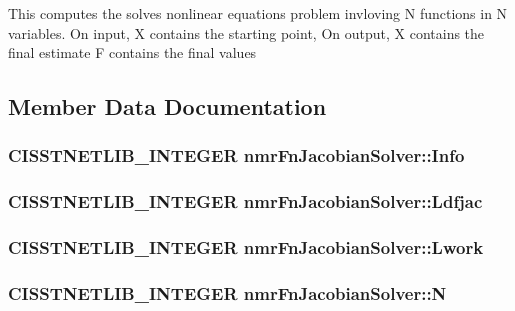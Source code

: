 This computes the solves nonlinear equations problem invloving N functions in N variables. On input, X contains the starting point, On output, X contains the final estimate F contains the final values 

\subsection{Member Data Documentation}
\hypertarget{classnmr_fn_jacobian_solver_afa9942d18f7d84f9fcb21f1d0e410fd3}{
\subsubsection[{Info}]{\setlength{\rightskip}{0pt plus 5cm}C\-I\-S\-S\-T\-N\-E\-T\-L\-I\-B\-\_\-\-I\-N\-T\-E\-G\-E\-R nmr\-Fn\-Jacobian\-Solver\-::\-Info\hspace{0.3cm}{\ttfamily [protected]}}}\label{classnmr_fn_jacobian_solver_afa9942d18f7d84f9fcb21f1d0e410fd3}
\hypertarget{classnmr_fn_jacobian_solver_a02cae10a0151e5937759820a96d87dc8}{
\subsubsection[{Ldfjac}]{\setlength{\rightskip}{0pt plus 5cm}C\-I\-S\-S\-T\-N\-E\-T\-L\-I\-B\-\_\-\-I\-N\-T\-E\-G\-E\-R nmr\-Fn\-Jacobian\-Solver\-::\-Ldfjac\hspace{0.3cm}{\ttfamily [protected]}}}\label{classnmr_fn_jacobian_solver_a02cae10a0151e5937759820a96d87dc8}
\hypertarget{classnmr_fn_jacobian_solver_a35ca595e6f6bc84e3aed0ac91643356c}{
\subsubsection[{Lwork}]{\setlength{\rightskip}{0pt plus 5cm}C\-I\-S\-S\-T\-N\-E\-T\-L\-I\-B\-\_\-\-I\-N\-T\-E\-G\-E\-R nmr\-Fn\-Jacobian\-Solver\-::\-Lwork\hspace{0.3cm}{\ttfamily [protected]}}}\label{classnmr_fn_jacobian_solver_a35ca595e6f6bc84e3aed0ac91643356c}
\hypertarget{classnmr_fn_jacobian_solver_a64a7c452930ff10113eebecb0557a6e5}{
\subsubsection[{N}]{\setlength{\rightskip}{0pt plus 5cm}C\-I\-S\-S\-T\-N\-E\-T\-L\-I\-B\-\_\-\-I\-N\-T\-E\-G\-E\-R nmr\-Fn\-Jacobian\-Solver\-::\-N\hspace{0.3cm}{\ttfamily [protected]}}}\label{classnmr_fn_jacobian_solver_a64a7c452930ff10113eebecb0557a6e5}
